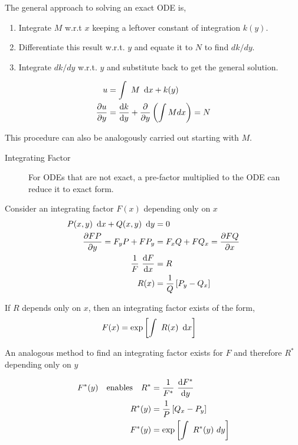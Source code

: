 The general approach to solving an exact ODE is,
\begin{enumerate}
    \item Integrate $ M $ w.r.t $ x $ keeping a leftover constant of integration $ k(y) $.
    \item Differentiate this result w.r.t. $ y $ and equate it to $ N $ to find $ dk/dy $.
    \item Integrate $ dk/dy $ w.r.t. $ y $ and substitute back to get the general solution.
\end{enumerate}

\begin{align}
    u            & = \int\ M\ \dl x + k(y)                                \\
    \diffp{u}{y} & = \diff{k}{y} + \diffp*{\left(\int M dx\right)}{y} = N
\end{align}

This procedure can also be analogously carried out starting with $ M $.

\begin{description}
    \item[Integrating Factor] For ODEs that are not exact, a pre-factor multiplied to the ODE
        can reduce it to exact form.
\end{description}

Consider an integrating factor $ F(x) $ depending only on $ x $
\begin{align}
    P(x, y) \ \dl x + Q(x, y)\ \dl y & = 0                                      \\
    \diffp{FP}{y} = F_{y}P + FP_{y}  & = F_{x} Q + F Q_{x} =  \diffp{FQ}{x}     \\
    \frac{1}{F}\ \diff{F}{x}         & = R                                      \\
    R(x)                             & = \frac{1}{Q} \left[P_{y} - Q_{x}\right]
\end{align}

If $ R $ depends only on $ x $, then an integrating factor exists of the form,
\begin{align}
    F(x) & = \exp \left[\int\ R(x)\ \dl x\right]
\end{align}

An analogous method to find an integrating factor exists for $ F $ and therefore $ R^{*} $
depending only on $ y $

\begin{align}
    F^{*}(y) \quad \text{enables}\quad R^{*} & = \frac{1}{F^{*}}\ \diff{F^{*}{}}{y}     \\
    R^{*}(y)                                 & = \frac{1}{P} \left[Q_{x} - P_{y}\right] \\
    F^{*}(y)                                 & = \exp \left[\int\ R^{*}(y)\ dy\right]
\end{align}

